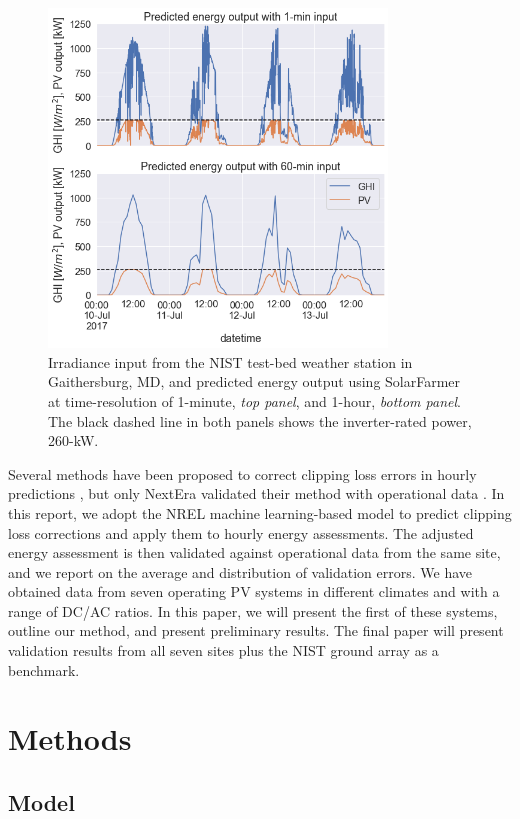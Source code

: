 \documentclass[conference]{IEEEtran}
\begin{document}
\begin{figure}[htbp]
\centerline{\includegraphics[width=9cm]{hourly_v_1-min_clipping.png}}
\caption{Irradiance input from the NIST test-bed weather station in Gaithersburg, MD, and predicted energy output using SolarFarmer at time-resolution of 1-minute, \textit{top panel}, and 1-hour, \textit{bottom panel}. The black dashed line in both panels shows the inverter-rated power, 260-kW.}
\label{fig:irradiance-and-power}
\end{figure}

Several methods have been proposed to correct clipping loss errors in hourly predictions \cite{Cormode2019,Kharait,Anderson2020,Bradford}, but only NextEra validated their method with operational data \cite{Bradford}. In this report, we adopt the NREL machine learning-based model \cite{Anderson2020} to predict clipping loss corrections and apply them to hourly energy assessments. The adjusted energy assessment is then validated against operational data from the same site, and we report on the average and distribution of validation errors.  We have obtained data from seven operating PV systems in different climates and with a range of DC/AC ratios. In this paper, we will present the first of these systems, outline our method, and present preliminary results. The final paper will present validation results from all seven sites plus the NIST ground array \cite{Boyd2017b} as a benchmark.

\section{Methods}

\subsection{Model}
\end{document}
